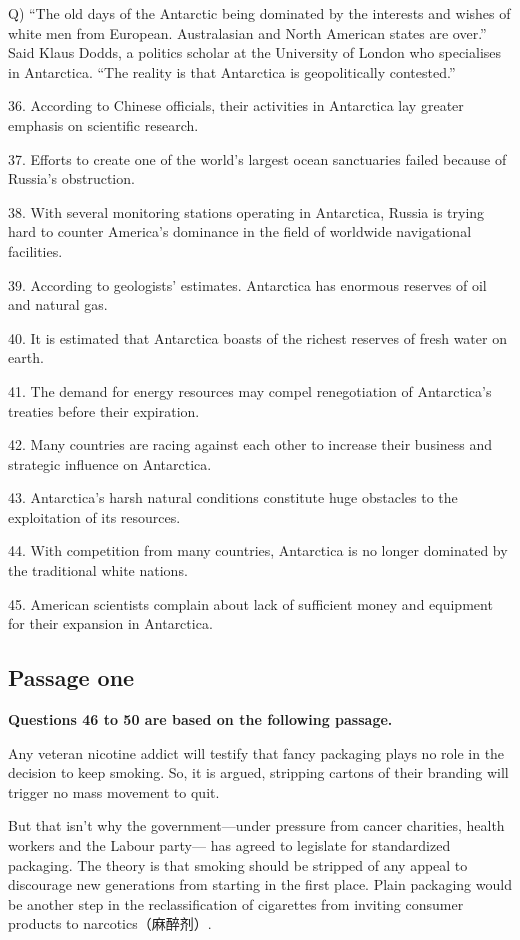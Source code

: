 \documentclass[UTF8,11pt]{ctexart}
\begin{document}
Q) “The old days of the Antarctic being dominated by the interests and wishes of white men from European. Australasian and North American states are over.” Said Klaus Dodds, a politics scholar at the University of London who specialises in Antarctica. “The reality is that Antarctica is geopolitically contested.”


36. According to Chinese officials, their activities in Antarctica lay greater emphasis on scientific research.


37. Efforts to create one of the world’s largest ocean sanctuaries failed because of Russia’s obstruction.


38. With several monitoring stations operating in Antarctica, Russia is trying hard to counter America’s dominance in the field of worldwide navigational facilities.


39. According to geologists’ estimates. Antarctica has enormous reserves of oil and natural gas.


40. It is estimated that Antarctica boasts of the richest reserves of fresh water on earth.


41. The demand for energy resources may compel renegotiation of Antarctica’s treaties before their expiration.


42. Many countries are racing against each other to increase their business and strategic influence on Antarctica.


43. Antarctica’s harsh natural conditions constitute huge obstacles to the exploitation of its resources.


44. With competition from many countries, Antarctica is no longer dominated by the traditional white nations.


45. American scientists complain about lack of sufficient money and equipment for their expansion in Antarctica.


\subsection*{\textbf{Passage one}}


\textbf{Questions 46 to 50 are based on the following passage.}


Any veteran nicotine addict will testify that fancy packaging plays no role in the decision to keep smoking. So, it is argued, stripping cartons of their branding will trigger no mass movement to quit.


But that isn’t why the government—under pressure from cancer charities, health workers and the Labour party— has agreed to legislate for standardized packaging. The theory is that smoking should be stripped of any appeal to discourage new generations from starting in the first place. Plain packaging would be another step in the reclassification of cigarettes from inviting consumer products to narcotics（麻醉剂）.
\end{document}
